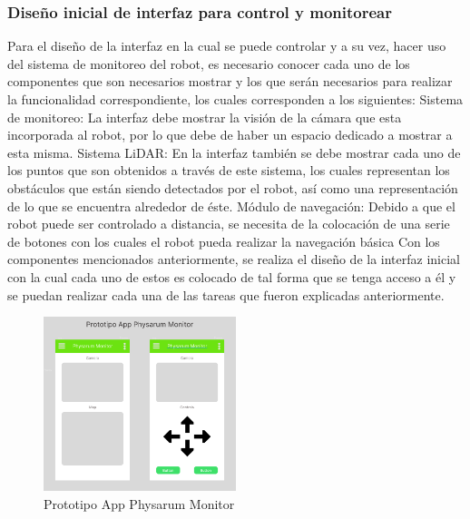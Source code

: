 \subsubsection{Dise\~no inicial de interfaz para control y monitorear}
    Para el dise\~no de la interfaz en la cual se puede controlar y a
        su vez, hacer uso del sistema de monitoreo del robot, es
        necesario conocer cada uno de los componentes que son
        necesarios mostrar y los que ser\'an necesarios para realizar la
        funcionalidad correspondiente, los cuales corresponden a los
        siguientes:
    \vskip 0.5cm
    Sistema de monitoreo: La interfaz debe mostrar la visi\'on de
        la c\'amara que esta incorporada al robot, por lo que debe de
        haber un espacio dedicado a mostrar a esta misma.
        \vskip 0.5cm
    Sistema LiDAR: En la interfaz tambi\'en se debe mostrar cada
        uno de los puntos que son obtenidos a trav\'es de este sistema,
        los cuales representan los obst\'aculos que est\'an siendo
        detectados por el robot, as\'i como una representaci\'on de lo
        que se encuentra alrededor de \'este.
        \vskip 0.5cm
    M\'odulo de navegaci\'on: Debido a que el robot puede ser
        controlado a distancia, se necesita de la colocaci\'on de una
        serie de botones con los cuales el robot pueda realizar la navegaci\'on b\'asica
        Con los componentes mencionados anteriormente, se realiza
        el dise\~no de la interfaz inicial con la cual cada uno de estos
        es colocado de tal forma que se tenga acceso a \'el y se
        puedan realizar cada una de las tareas que fueron explicadas
        anteriormente.
    \vskip 0.5cm
    \begin{figure}[htbp]
        \centering
        \includegraphics[width=0.5\textwidth]{./images/Pruebas/simulador/image077.png}
        \caption{Prototipo App Physarum Monitor}
        \label{fig:77}
    \end{figure}
